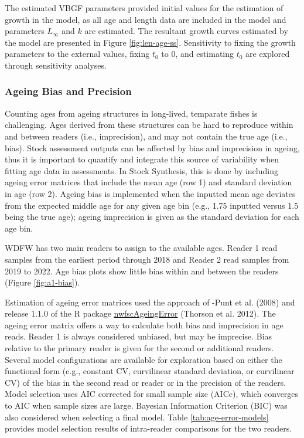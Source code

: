 \documentclass[11pt,
  letterpaper,
]{article}
\begin{document}
The estimated VBGF parameters provided initial values for the estimation of growth in the model, as all age and length data are included in the model and parameters \(L_{\infty}\) and \(k\) are estimated. The resultant growth curves estimated by the model are presented in Figure \ref{fig:len-age-ss}. Sensitivity to fixing the growth parameters to the external values, fixing \(t_0\) to 0, and estimating \(t_0\) are explored through sensitivity analyses.

\hypertarget{ageing-bias-and-precision}{%
\subsubsection{Ageing Bias and Precision}\label{ageing-bias-and-precision}}

Counting ages from ageing structures in long-lived, temparate fishes is challenging. Ages derived from these structures can be hard to reproduce within and between readers (i.e., imprecision), and may not contain the true age (i.e., bias). Stock assessment outputs can be affected by bias and imprecision in ageing, thus it is important to quantify and integrate this source of variability when fitting age data in assessments. In Stock Synthesis, this is done by including ageing error matrices that include the mean age (row 1) and standard deviation in age (row 2). Ageing bias is implemented when the inputted mean age deviates from the expected middle age for any given age bin (e.g., 1.75 inputted versus 1.5 being the true age); ageing imprecision is given as the standard deviation for each age bin.

WDFW has two main readers to assign to the available ages. Reader 1 read samples from the earliest period through 2018 and Reader 2 read samples from 2019 to 2022. Age bias plots show little bias within and between the readers (Figure \ref{fig:a1-bias}).

Estimation of ageing error matrices used the approach of -Punt et al. (2008) and release 1.1.0 of the R package \href{https://github.com/pfmc-assessments/nwfscAgeingError}{nwfscAgeingError} (Thorson et al. 2012). The ageing error matrix offers a way to calculate both bias and imprecision in age reads. Reader 1 is always considered unbiased, but may be imprecise. Bias relative to the primary reader is given for the second or additional readers. Several model configurations are available for exploration based on either the functional form (e.g., constant CV, curvilinear standard deviation, or curvilinear CV) of the bias in the second read or reader or in the precision of the readers. Model selection uses AIC corrected for small sample size (AICc), which converges to AIC when sample sizes are large. Bayesian Information Criterion (BIC) was also considered when selecting a final model. Table \ref{tab:age-error-models} provides model selection results of intra-reader comparisons for the two readers.
\end{document}
